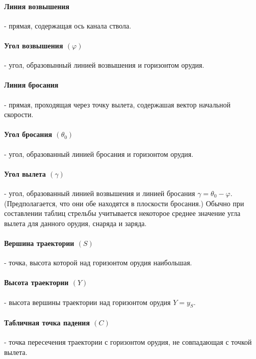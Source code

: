 \paragraph{Линия возвышения }- прямая, содержащая ось канала ствола.

\paragraph{Угол возвышения $( \varphi )$ }- угол, образовынный линией возвышения и горизонтом орудия.

\paragraph{Линия бросания }- прямая, проходящая через точку вылета, содержашая вектор начальной скорости.

\paragraph{Угол бросания $( \theta_0 )$ }- угол, образованный линией бросания и горизонтом орудия.

\paragraph{Угол вылета $( \gamma )$ }- угол, образованный линией возвышения и линией бросания $\gamma = \theta_0 - \varphi$. (Предполагается, что они обе находятся в плоскости бросания.) Обычно при составлении таблиц стрельбы учитывается некоторое среднее значение угла вылета для данного орудия, снаряда и заряда.

\paragraph{Вершина траектории $( S )$ }- точка, высота которой над горизонтом орудия наибольшая.

\paragraph{Высота траектории $(Y)$ }- высота вершины траектории над горизонтом орудия $Y = y_S$.

\paragraph{Табличная точка падения $( C )$ }- точка пересечения траектории с горизонтом орудия, не совпадающая с точкой вылета.

